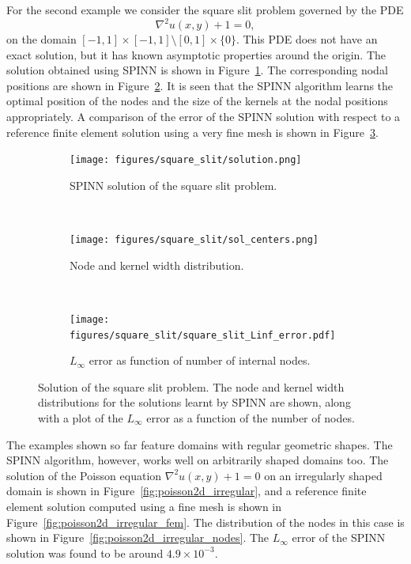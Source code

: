 \documentclass[12pt]{article}
\begin{document}
For the second example we consider the square slit problem governed by the PDE
\begin{displaymath}
\nabla^2 u(x, y) + 1 = 0,
\end{displaymath}
on the domain $[-1,1]\times[-1,1] \setminus [0,1]\times\{0\}$. This PDE does not have an exact solution, but it has known asymptotic properties around the origin. The solution obtained using SPINN is shown in Figure~\ref{fig:poisson_2d_square_slit_sol}. The corresponding nodal positions are shown in Figure~\ref{fig:poisson_2d_square_slit_nodes}. It is seen that the SPINN algorithm learns the optimal position of the nodes and the size of the kernels at the nodal positions appropriately. A comparison of the error of the SPINN solution with respect to a reference finite element solution using a very fine mesh is shown in Figure~\ref{fig:poisson_2d_square_slit_convergence}.

\begin{figure}
\begin{subfigure}{0.32\textwidth}
\texttt{[image: figures/square\_slit/solution.png]}
\caption{SPINN solution of the square slit problem.}
\label{fig:poisson_2d_square_slit_sol}
\end{subfigure}
~
\begin{subfigure}{0.32\textwidth}
\texttt{[image: figures/square\_slit/sol\_centers.png]}
\caption{Node and kernel width distribution.}
\label{fig:poisson_2d_square_slit_nodes}
\end{subfigure}
~
\begin{subfigure}{0.32\textwidth}
\texttt{[image: figures/square\_slit/square\_slit\_Linf\_error.pdf]}
\caption{$L_{\infty}$ error as function of number of internal nodes.}
\label{fig:poisson_2d_square_slit_convergence}
\end{subfigure}
\caption{Solution of the square slit problem. The node and kernel width distributions for the solutions learnt by SPINN are shown, along with a plot of the $L_\infty$ error as a function of the number of nodes.}
\label{fig:spinn_pde2d_square_slit}
\end{figure}

The examples shown so far feature domains with regular geometric shapes. The SPINN algorithm, however, works well on arbitrarily shaped domains too. The solution of the Poisson equation $\nabla^2 u(x,y) + 1 = 0$ on an irregularly shaped domain is shown in Figure~\ref{fig:poisson2d_irregular}, and a reference finite element solution computed using a fine mesh is shown in Figure~\ref{fig:poisson2d_irregular_fem}. The distribution of the nodes in this case is shown in Figure~\ref{fig:poisson2d_irregular_nodes}. The $L_{\infty}$ error of the SPINN solution was found to be around $4.9\times 10^{-3}$.
\end{document}
